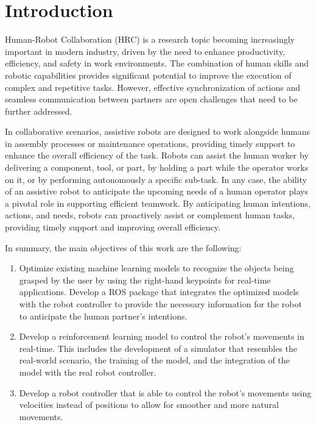 \section{Introduction}

Human-Robot Collaboration (HRC) is a research topic becoming increasingly important in modern industry, driven by the need to enhance productivity, efficiency, and safety in work environments. The combination of human skills and robotic capabilities provides significant potential to improve the execution of complex and repetitive tasks. However, effective synchronization of actions and seamless communication between partners are open challenges that need to be further addressed.

In collaborative scenarios, assistive robots are designed to work alongside humans in assembly processes or maintenance operations, providing timely support to enhance the overall efficiency of the task. Robots can assist the human worker by delivering a component, tool, or part, by holding a part while the operator works on it, or by performing autonomously a specific sub-task. In any case, the ability of an assistive robot to anticipate the upcoming needs of a human operator plays a pivotal role in supporting efficient teamwork. By anticipating human intentions, actions, and needs, robots can proactively assist or complement human tasks, providing timely support and improving overall efficiency.

In summary, the main objectives of this work are the following:
\begin{enumerate}
    \item Optimize existing machine learning models to recognize the objects being grasped by the user by using the right-hand keypoints for real-time applications. Develop a ROS package that integrates the optimized models with the robot controller to provide the necessary information for the robot to anticipate the human partner's intentions.

    \item Develop a reinforcement learning model to control the robot's movements in real-time. This includes the development of a simulator that resembles the real-world scenario, the training of the model, and the integration of the model with the real robot controller.

    \item Develop a robot controller that is able to control the robot's movements using velocities instead of positions to allow for smoother and more natural movements.
\end{enumerate}